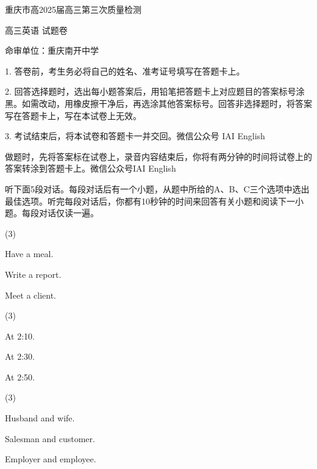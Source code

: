 \documentclass{英语试卷}
\begin{document}
\par 重庆市高2025届高三第三次质量检测\par
\par 高三英语 试题卷\par
\par 命审单位：重庆南开中学\par
\begin{notice}
\par 1. 答卷前，考生务必将自己的姓名、准考证号填写在答题卡上。\par
\par 2. 回答选择题时，选出每小题答案后，用铅笔把答题卡上对应题目的答案标号涂黑。如需改动，用橡皮擦干净后，再选涂其他答案标号。回答非选择题时，将答案写在答题卡上，写在本试卷上无效。\par
\par 3. 考试结束后，将本试卷和答题卡一并交回。微信公众号 IAI English\par
\end{notice}
\par 做题时，先将答案标在试卷上，录音内容结束后，你将有两分钟的时间将试卷上的答案转涂到答题卡上。微信公众号IAI English\par
{}
\par 听下面5段对话。每段对话后有一个小题，从题中所给的A、B、C三个选项中选出最佳选项。听完每段对话后，你都有10秒钟的时间来回答有关小题和阅读下一小题。每段对话仅读一遍。\par
{}
\begin{choices}(3)
  \item Have a meal.
  \item Write a report.
  \item Meet a client.
\end{choices}
\begin{choices}(3)
  \item At 2:10.
  \item At 2:30.
  \item At 2:50.
\end{choices}
\begin{choices}(3)
  \item Husband and wife.
  \item Salesman and customer.
  \item Employer and employee.
\end{choices}
\end{document}
